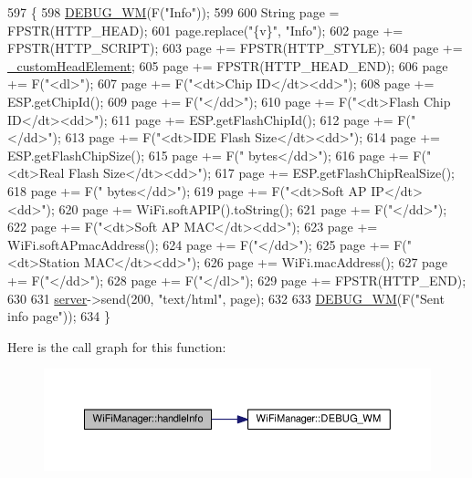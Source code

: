 \begin{DoxyCode}
597                              \{
598   \hyperlink{class_wi_fi_manager_ae5f595c670ccbcf9a191baf50f5c7c26}{DEBUG\_WM}(F(\textcolor{stringliteral}{"Info"}));
599 
600   String page = FPSTR(HTTP\_HEAD);
601   page.replace(\textcolor{stringliteral}{"\{v\}"}, \textcolor{stringliteral}{"Info"});
602   page += FPSTR(HTTP\_SCRIPT);
603   page += FPSTR(HTTP\_STYLE);
604   page += \hyperlink{class_wi_fi_manager_a8860012564a62209d750c50e56319192}{\_customHeadElement};
605   page += FPSTR(HTTP\_HEAD\_END);
606   page += F(\textcolor{stringliteral}{"<dl>"});
607   page += F(\textcolor{stringliteral}{"<dt>Chip ID</dt><dd>"});
608   page += ESP.getChipId();
609   page += F(\textcolor{stringliteral}{"</dd>"});
610   page += F(\textcolor{stringliteral}{"<dt>Flash Chip ID</dt><dd>"});
611   page += ESP.getFlashChipId();
612   page += F(\textcolor{stringliteral}{"</dd>"});
613   page += F(\textcolor{stringliteral}{"<dt>IDE Flash Size</dt><dd>"});
614   page += ESP.getFlashChipSize();
615   page += F(\textcolor{stringliteral}{" bytes</dd>"});
616   page += F(\textcolor{stringliteral}{"<dt>Real Flash Size</dt><dd>"});
617   page += ESP.getFlashChipRealSize();
618   page += F(\textcolor{stringliteral}{" bytes</dd>"});
619   page += F(\textcolor{stringliteral}{"<dt>Soft AP IP</dt><dd>"});
620   page += WiFi.softAPIP().toString();
621   page += F(\textcolor{stringliteral}{"</dd>"});
622   page += F(\textcolor{stringliteral}{"<dt>Soft AP MAC</dt><dd>"});
623   page += WiFi.softAPmacAddress();
624   page += F(\textcolor{stringliteral}{"</dd>"});
625   page += F(\textcolor{stringliteral}{"<dt>Station MAC</dt><dd>"});
626   page += WiFi.macAddress();
627   page += F(\textcolor{stringliteral}{"</dd>"});
628   page += F(\textcolor{stringliteral}{"</dl>"});
629   page += FPSTR(HTTP\_END);
630 
631   \hyperlink{class_wi_fi_manager_a509523a01c0395cf0dc235b074f2a5ea}{server}->send(200, \textcolor{stringliteral}{"text/html"}, page);
632 
633   \hyperlink{class_wi_fi_manager_ae5f595c670ccbcf9a191baf50f5c7c26}{DEBUG\_WM}(F(\textcolor{stringliteral}{"Sent info page"}));
634 \}
\end{DoxyCode}
Here is the call graph for this function\+:
\nopagebreak
\begin{figure}[H]
\begin{center}
\leavevmode
\includegraphics[width=350pt]{d4/dc8/class_wi_fi_manager_ac35e46661f8a209d84bba62d9aa43a35_cgraph}
\end{center}
\end{figure}
